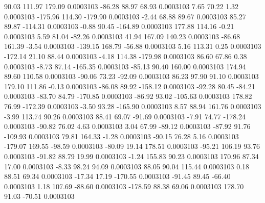        90.03      111.97      179.09     0.0003103
      -86.28       88.97       68.93     0.0003103
        7.65       70.22        1.32     0.0003103
     -175.96      114.30     -179.90     0.0003103
       -2.44       68.88       89.67     0.0003103
       85.27       89.87     -114.31     0.0003103
       -0.88       90.45     -164.89     0.0003103
      177.88      114.16       -0.21     0.0003103
        5.59       81.04      -82.26     0.0003103
       41.94      167.09      140.23     0.0003103
      -86.68      161.39       -3.54     0.0003103
     -139.15      168.79      -56.88     0.0003103
        5.16      113.31        0.25     0.0003103
     -172.14       21.10       88.44     0.0003103
       -4.18      114.38     -179.98     0.0003103
       86.60       67.86        0.38     0.0003103
       -8.73       87.14     -165.35     0.0003103
      -85.13       90.40      160.00     0.0003103
      174.94       89.60      110.58     0.0003103
      -90.06       73.23      -92.09     0.0003103
       86.23       97.90       91.10     0.0003103
      179.10      111.86       -0.13     0.0003103
      -86.08       89.92     -158.12     0.0003103
      -92.28       80.45      -84.21     0.0003103
      -83.70       84.79     -170.85     0.0003103
      -86.92       93.02     -105.63     0.0003103
      178.82       76.99     -172.39     0.0003103
       -3.50       93.28     -165.90     0.0003103
        8.57       88.94      161.76     0.0003103
       -3.99      113.74       90.26     0.0003103
       88.41       69.07      -91.69     0.0003103
       -7.91       74.77     -178.24     0.0003103
      -90.82       76.02        4.63     0.0003103
        3.04       67.99      -89.12     0.0003103
      -87.92       91.76     -109.93     0.0003103
       79.81      164.33       -1.28     0.0003103
      -90.15       76.28        5.16     0.0003103
     -179.07      169.55      -98.59     0.0003103
      -80.09       19.14      178.51     0.0003103
      -95.21      106.19       93.76     0.0003103
      -91.82       88.79       19.99     0.0003103
       -1.24      155.83       90.23     0.0003103
      170.96       87.34       17.00     0.0003103
       -8.33       98.24       94.09     0.0003103
       88.05       90.04      115.44     0.0003103
        0.18       88.51       69.34     0.0003103
      -17.34       17.19     -170.55     0.0003103
      -91.45       89.45      -66.40     0.0003103
        1.18      107.69      -88.60     0.0003103
     -178.59       88.38       69.06     0.0003103
      178.70       91.03      -70.51     0.0003103
